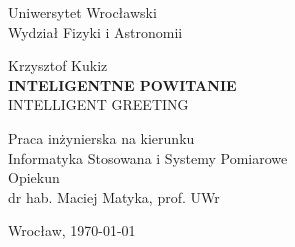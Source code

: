 \documentclass[a4paper,12pt,reqno]{article}
\begin{document}


\begin{center}

\thispagestyle{empty}

\Large 
Uniwersytet Wrocławski\\
Wydział Fizyki i Astronomii\\
\vspace{0.8cm}
\vspace{1.8cm}

\Large Krzysztof Kukiz \\
\vspace{3.2cm}
\Large \textbf{INTELIGENTNE POWITANIE} \\
\vspace{1.5cm}
INTELLIGENT GREETING
\end{center}
\vspace{3.7cm}
\begin{flushright}
\large{ Praca inżynierska na kierunku \\Informatyka Stosowana i Systemy Pomiarowe \\}
\vspace{0.5cm}
\large{ Opiekun \\ dr hab. Maciej Matyka, prof. UWr}
\end{flushright}
\vspace{2.2cm}

\begin{center}
\large Wrocław, \today
\end{center}

\newpage

\tableofcontents

\newpage
\end{document}
